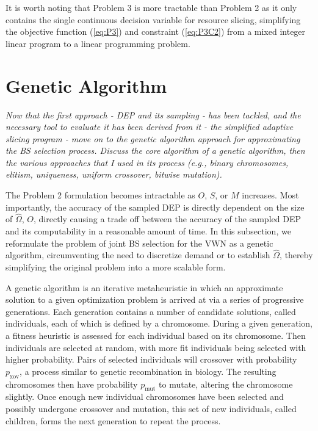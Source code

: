 \documentclass[12pt,dvips]{report}
\begin{document}
It is worth noting that Problem 3 is more tractable than Problem 2 as it only contains the single continuous decision variable for resource slicing, simplifying the objective function (\ref{eq:P3}) and constraint (\ref{eq:P3C2}) from a mixed integer linear program to a linear programming problem.

\section{Genetic Algorithm} \label{sec:ga}

\textit{Now that the first approach - DEP and its sampling - has been tackled, and the necessary tool to evaluate it has been derived from it - the simplified adaptive slicing program - move on to the genetic algorithm approach for approximating the BS selection process.  Discuss the core algorithm of a genetic algorithm, then the various approaches that I used in its process (e.g., binary chromosomes, elitism, uniqueness, uniform crossover, bitwise mutation).}

The Problem 2 formulation becomes intractable as $O$, $S$, or $M$ increases.  Most importantly, the accuracy of the sampled DEP is directly dependent on the size of $\hat{\Omega}$, $O$, directly causing a trade off between the accuracy of the sampled DEP and its computability in a reasonable amount of time.  In this subsection, we reformulate the problem of joint BS selection for the VWN as a genetic algorithm, circumventing the need to discretize demand or to establish $\hat{\Omega}$, thereby simplifying the original problem into a more scalable form.

A genetic algorithm is an iterative metaheuristic in which an approximate solution to a given optimization problem is arrived at via a series of progressive generations.  Each generation contains a number of candidate solutions, called individuals, each of which is defined by a chromosome.  During a given generation, a fitness heuristic is assessed for each individual based on its chromosome.  Then individuals are selected at random, with more fit individuals being selected with higher probability.  Pairs of selected individuals will crossover with probability $p_\text{xov}$, a process similar to genetic recombination in biology.  The resulting chromosomes then have probability $p_\text{mut}$ to mutate, altering the chromosome slightly.  Once enough new individual chromosomes have been selected and possibly undergone crossover and mutation, this set of new individuals, called children, forms the next generation to repeat the process.  %
\end{document}
